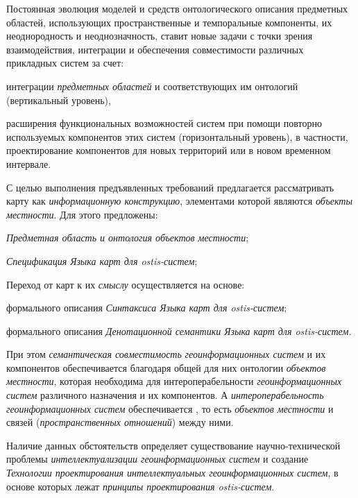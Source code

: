 Постоянная эволюция моделей и средств онтологического описания предметных областей, использующих пространственные и темпоральные компоненты, их неоднородность и неоднозначность, ставит новые задачи с точки зрения взаимодействия, интеграции и обеспечения совместимости различных прикладных систем за счет:
\begin{textitemize}
	\item интеграции \textit{предметных областей} и соответствующих им онтологий (вертикальный уровень), 
	\item расширения функциональных возможностей систем при помощи повторно используемых компонентов этих систем (горизонтальный уровень), в частности, проектирование компонентов для новых территорий или в новом временном интервале.
\end{textitemize}

С целью выполнения предъявленных требований предлагается рассматривать карту как \textit{информационную конструкцию}, элементами которой являются \textit{объекты местности}. Для этого предложены:
\begin{textitemize}
	\item \textit{Предметная область и онтология объектов местности};
	\item \textit{Спецификация Языка карт для ostis-систем};
\end{textitemize}

Переход от карт к их \textit{смыслу} осуществляется на основе:
\begin{textitemize}
	\item формального описания \textit{Синтаксиса Языка карт для ostis-систем};
	\item формального описания \textit{Денотационной семантики Языка карт для ostis-систем}.
\end{textitemize}

При этом \textit{семантическая совместимость} \textit{геоинформационных систем} и их компонентов обеспечивается благодаря общей для них онтологии \textit{объектов местности}, которая необходима для интероперабельности \textit{геоинформационных систем} различного назначения и их компонентов. А \textit{интероперабельность геоинформационных систем} обеспечивается , то есть \textit{объектов местности} и связей (\textit{пространственных отношений}) между ними.

Наличие данных обстоятельств определяет существование научно-технической проблемы \textit{интеллектуализации геоинформационных систем} и создание \textit{Технологии проектирования интеллектуальных геоинформационных систем}, в основе которых лежат \textit{принципы проектирования ostis-систем}.

